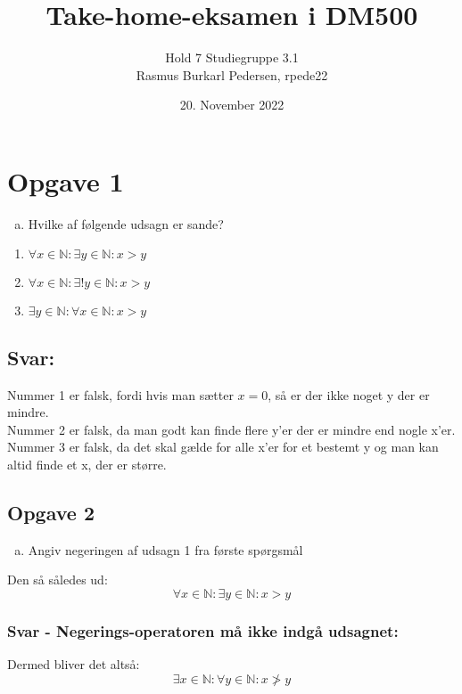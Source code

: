\documentclass{article}
\title{Take-home-eksamen i DM500}
\author{Hold 7 Studiegruppe 3.1 \\ Rasmus Burkarl Pedersen, rpede22}
\date{20. November 2022}
\begin{document}
\maketitle

\section{Opgave 1}
\begin{enumerate}[a)]
    \item {Hvilke af følgende udsagn er sande?}
\end{enumerate}

\begin{enumerate} \centering
    \item $ \forall x \in \mathbb{N} : \exists y \in \mathbb{N} : x>y$
    \item $ \forall x \in \mathbb{N} : \exists ! y \in \mathbb{N} : x>y$
    \item $ \exists y \in \mathbb{N} : \forall x \in \mathbb{N} : x>y$
\end{enumerate}
    
\subsection{Svar:}
Nummer 1 er falsk, fordi hvis man sætter $x=0$, så er der ikke noget y der er mindre.
\\
Nummer 2 er falsk, da man godt kan finde flere y'er der er mindre end nogle x'er.
\\
Nummer 3 er falsk, da det skal gælde for alle x'er for et bestemt y og man kan altid finde et x, der er større.

\subsection{Opgave 2}
\begin{enumerate}[b)]
    \item Angiv negeringen af udsagn 1 fra første spørgsmål
\end{enumerate}
Den så således ud:
\[ \forall x \in \mathbb{N} : \exists y \in \mathbb{N} : x>y\]

\subsubsection{Svar - Negerings-operatoren må ikke indgå udsagnet:}
Dermed bliver det altså:
\[ \exists x \in \mathbb{N} : \forall y \in \mathbb{N} : x \not> y\]
\end{document}
